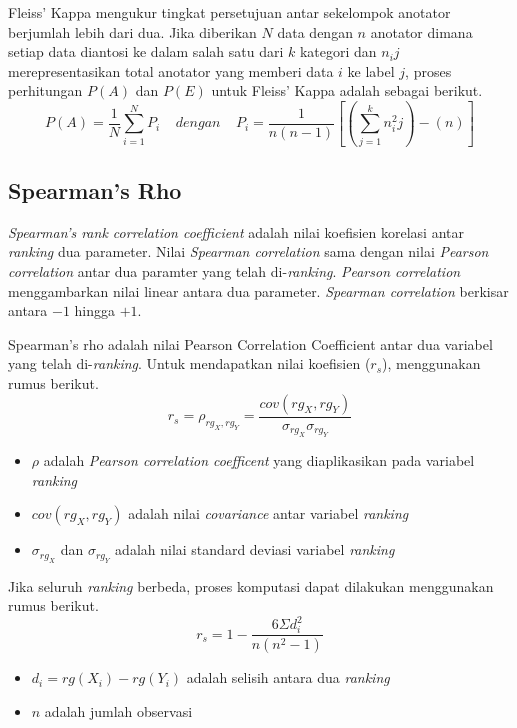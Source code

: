 Fleiss' Kappa mengukur tingkat persetujuan antar sekelompok anotator berjumlah lebih dari dua. Jika diberikan $N$ data dengan $n$ anotator dimana setiap data diantosi ke dalam salah satu dari $k$ kategori dan $n_ij$ merepresentasikan total anotator yang memberi data $i$ ke label $j$, proses perhitungan $P(A)$ dan $P(E)$ untuk Fleiss' Kappa adalah sebagai berikut.
\[ P(A)=\frac{1}{N}\sum_{i=1}^{N}P_i \:\:\:\:\:dengan\:\:\:\:\: P_i=\frac{1}{n(n-1)}[(\sum_{j=1}^{k}n^2_ij)-(n)] \]


\subsection{Spearman's Rho}
\textit{Spearman's rank correlation coefficient} adalah nilai koefisien korelasi antar \textit{ranking} dua parameter. Nilai \textit{Spearman correlation} sama dengan nilai \textit{Pearson correlation} antar dua paramter yang telah di-\textit{ranking}. \textit{Pearson correlation}  menggambarkan nilai linear antara dua parameter. \textit{Spearman correlation} berkisar antara $-1$ hingga $+1$.

Spearman's rho adalah nilai Pearson Correlation Coefficient antar dua variabel yang telah di-\textit{ranking}. Untuk mendapatkan nilai koefisien ($r_s$), menggunakan rumus berikut.
\[ r_s = \rho_{rg_X,rg_Y} = \frac{cov(rg_X,rg_Y)}{\sigma_{rg_X}\sigma_{rg_Y}} \]
\begin{itemize}
  \item $\rho$ adalah \textit{Pearson correlation coefficent} yang diaplikasikan pada variabel \textit{ranking}
  \item $cov(rg_X,rg_Y)$ adalah nilai \textit{covariance} antar variabel \textit{ranking}
  \item $\sigma_{rg_X}$ dan $\sigma_{rg_Y}$ adalah nilai standard deviasi variabel \textit{ranking}
\end{itemize}
Jika seluruh \textit{ranking} berbeda, proses komputasi dapat dilakukan menggunakan rumus berikut.
\[ r_s = 1-\frac{6 \Sigma d_i^2}{n(n^2-1)} \]
\begin{itemize}
  \item $d_i = rg(X_i)-rg(Y_i)$ adalah selisih antara dua \textit{ranking}
  \item $n$ adalah jumlah observasi
\end{itemize}
